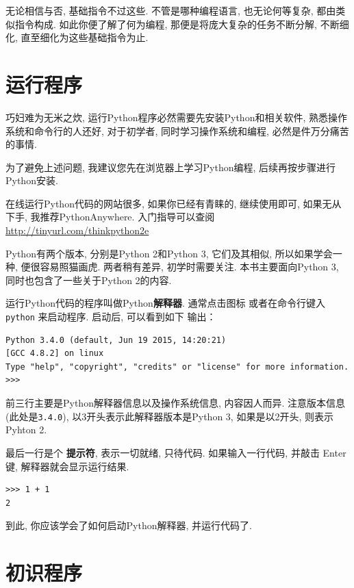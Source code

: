 \documentclass[10pt]{book}
\begin{document}
无论相信与否, 基础指令不过这些. 
不管是哪种编程语言, 
也无论何等复杂, 都由类似指令构成. 
如此你便了解了何为编程, 
那便是将庞大复杂的任务不断分解, 
不断细化, 直至细化为这些基础指令为止. 


\section{运行程序}

巧妇难为无米之炊, 运行Python程序必然需要先安装Python和相关软件, 
熟悉操作系统和命令行的人还好, 对于初学者, 同时学习操作系统和编程, 
必然是件万分痛苦的事情. 

为了避免上述问题, 
我建议您先在浏览器上学习Python编程, 后续再按步骤进行Python安装. 

在线运行Python代码的网站很多, 
如果你已经有青睐的, 继续使用即可,
如果无从下手, 我推荐PythonAnywhere. 
入门指导可以查阅\url{http://tinyurl.com/thinkpython2e}

Python有两个版本, 分别是Python 2和Python 3, 它们及其相似, 
所以如果学会一种, 便很容易照猫画虎. 两者稍有差异, 初学时需要关注. 
本书主要面向Python 3, 同时也包含了一些关于Python 2的内容. 

运行Python代码的程序叫做Python{\bf 解释器}. 通常点击图标
或者在命令行键入{\tt python} 来启动程序. 启动后, 可以看到如下
输出：

\begin{verbatim}
Python 3.4.0 (default, Jun 19 2015, 14:20:21) 
[GCC 4.8.2] on linux
Type "help", "copyright", "credits" or "license" for more information.
>>> 
\end{verbatim}
%

前三行主要是Python解释器信息以及操作系统信息, 内容因人而异. 
注意版本信息(此处是{\tt 3.4.0}), 以3开头表示此解释器版本是Python 3, 
如果是以2开头, 则表示Pyhton 2. 

最后一行是个 {\bf 提示符}, 表示一切就绪, 只待代码. 
如果输入一行代码, 并敲击 Enter键, 解释器就会显示运行结果. 

\begin{verbatim}
>>> 1 + 1
2
\end{verbatim}
%

到此, 你应该学会了如何启动Python解释器, 并运行代码了. 

\section{初识程序}
\label{hello}
\end{document}
